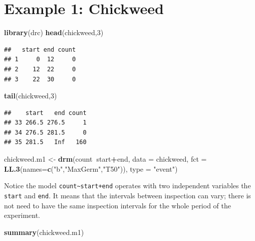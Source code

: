 \documentclass[letterpaper,]{book}
\newenvironment{Shaded}{\begin{snugshade}}{\end{snugshade}}
\newcommand{\DataTypeTok}[1]{\textcolor[rgb]{0.13,0.29,0.53}{#1}}
\newcommand{\DecValTok}[1]{\textcolor[rgb]{0.00,0.00,0.81}{#1}}
\newcommand{\KeywordTok}[1]{\textcolor[rgb]{0.13,0.29,0.53}{\textbf{#1}}}
\newcommand{\NormalTok}[1]{#1}
\newcommand{\OperatorTok}[1]{\textcolor[rgb]{0.81,0.36,0.00}{\textbf{#1}}}
\newcommand{\StringTok}[1]{\textcolor[rgb]{0.31,0.60,0.02}{#1}}
\begin{document}
\hypertarget{example-1-chickweed}{%
\section{Example 1: Chickweed}\label{example-1-chickweed}}

\begin{Shaded}
\begin{Highlighting}[]
\KeywordTok{library}\NormalTok{(drc)}
\KeywordTok{head}\NormalTok{(chickweed,}\DecValTok{3}\NormalTok{)}
\end{Highlighting}
\end{Shaded}

\begin{verbatim}
##   start end count
## 1     0  12     0
## 2    12  22     0
## 3    22  30     0
\end{verbatim}

\begin{Shaded}
\begin{Highlighting}[]
\KeywordTok{tail}\NormalTok{(chickweed,}\DecValTok{3}\NormalTok{)}
\end{Highlighting}
\end{Shaded}

\begin{verbatim}
##    start   end count
## 33 266.5 276.5     1
## 34 276.5 281.5     0
## 35 281.5   Inf   160
\end{verbatim}

\begin{Shaded}
\begin{Highlighting}[]
\NormalTok{chickweed.m1 <-}\StringTok{ }\KeywordTok{drm}\NormalTok{(count}\OperatorTok{~}\NormalTok{start}\OperatorTok{+}\NormalTok{end, }\DataTypeTok{data =}\NormalTok{ chickweed, }\DataTypeTok{fct =} \KeywordTok{LL.3}\NormalTok{(}\DataTypeTok{names=}\KeywordTok{c}\NormalTok{(}\StringTok{"b"}\NormalTok{,}\StringTok{"MaxGerm"}\NormalTok{,}\StringTok{"T50"}\NormalTok{)), }\DataTypeTok{type =} \StringTok{"event"}\NormalTok{)}
\end{Highlighting}
\end{Shaded}

Notice the model \texttt{count\textasciitilde{}start+end} operates with two independent variables the \texttt{start} and \texttt{end}. It means that the intervals between inspection can vary; there is not need to have the same inspection intervals for the whole period of the experiment.

\begin{Shaded}
\begin{Highlighting}[]
\KeywordTok{summary}\NormalTok{(chickweed.m1)  }
\end{Highlighting}
\end{Shaded}
\end{document}
